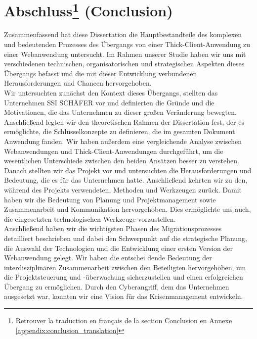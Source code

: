 \documentclass[a4paper, 12pt, french]{article}
\begin{document}
	\part*{Abschluss\footnote{Retrouver la traduction en français de la section Conclusion en Annexe \ref{appendix:conclusion_translation} } (Conclusion)}
		Zusammenfassend hat diese Dissertation die Hauptbestandteile des komplexen und bedeutenden Prozesses des Übergangs von einer Thick-Client-Anwendung zu einer Webanwendung untersucht. Im Rahmen unserer Studie haben wir uns mit verschiedenen technischen, organisatorischen und strategischen Aspekten dieses Übergangs befasst und die mit dieser Entwicklung verbundenen Herausforderungen und Chancen hervorgehoben.\\

		Wir untersuchten zunächst den Kontext dieses Übergangs, stellten das Unternehmen SSI SCHÄFER vor und definierten die Gründe und die Motivationen, die das Unternehmen zu dieser großen Veränderung bewegten. Anschließend legten wir den theoretischen Rahmen der Dissertation fest, der es ermöglichte, die Schlüsselkonzepte zu definieren, die im gesamten Dokument Anwendung fanden. Wir haben außerdem eine vergleichende Analyse zwischen Webanwendungen und Thick-Client-Anwendungen durchgeführt, um die wesentlichen Unterschiede zwischen den beiden Ansätzen besser zu verstehen.\\

		Danach stellten wir das Projekt vor und untersuchten die Herausforderungen und Bedeutung, die es für das Unternehmen hatte. Anschließend kehrten wir zu den, während des Projekts verwendeten, Methoden und Werkzeugen zurück. Damit haben wir die Bedeutung von Planung und Projektmanagement sowie Zusammenarbeit und Kommunikation hervorgehoben. Dies ermöglichte uns auch, die eingesetzten technologischen Werkzeuge vorzustellen.\\

		Anschließend haben wir die wichtigsten Phasen des Migrationsprozesses detailliert beschrieben und dabei den Schwerpunkt auf die strategische Planung, die Auswahl der Technologien und die Entwicklung einer ersten Version der Webanwendung gelegt. Wir haben die entschei dende Bedeutung der interdisziplinären Zusammenarbeit zwischen den Beteiligten hervorgehoben, um die Projektsteuerung und -überwachung sicherzustellen und einen erfolgreichen Übergang zu ermöglichen. Durch den Cyberangriff, dem das Unternehmen ausgesetzt war, konnten wir eine Vision für das Krisenmanagement entwickeln.\\
\end{document}
